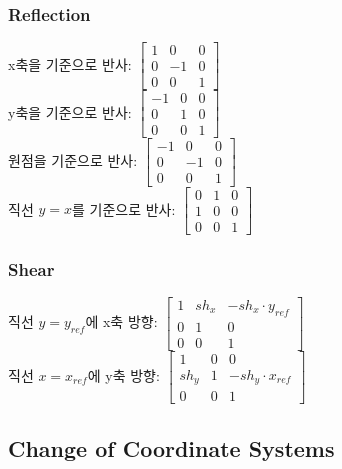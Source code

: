 \subsubsection{Reflection}

x축을 기준으로 반사:
$
\begin{bmatrix}
  1 & 0 & 0 \\
  0 & -1 & 0 \\
  0 & 0 & 1
\end{bmatrix}
$
\\
y축을 기준으로 반사:
$
\begin{bmatrix}
  -1 & 0 & 0 \\
  0 & 1 & 0 \\
  0 & 0 & 1
\end{bmatrix}
$
\\
원점을 기준으로 반사:
$
\begin{bmatrix}
  -1 & 0 & 0 \\
  0 & -1 & 0 \\
  0 & 0 & 1
\end{bmatrix}
$
\\
직선 $y = x$를 기준으로 반사:
$
\begin{bmatrix}
  0 & 1 & 0 \\
  1 & 0 & 0 \\
  0 & 0 & 1
\end{bmatrix}
$

\subsubsection{Shear}

직선 $y = y_{ref}$에 x축 방향:
$
\begin{bmatrix}
  1 & sh_x & -sh_x \cdot y_{ref} \\
  0 & 1 & 0 \\
  0 & 0 & 1
\end{bmatrix}
$
\\
직선 $x = x_{ref}$에 y축 방향:
$
\begin{bmatrix}
  1 & 0 & 0 \\
  sh_y & 1 & -sh_y \cdot x_{ref} \\
  0 & 0 & 1
\end{bmatrix}
$

\subsection{Change of Coordinate Systems}

